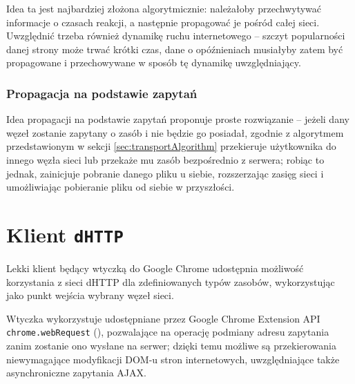 Idea ta jest najbardziej złożona algorytmicznie: należałoby przechwytywać informacje o czasach reakcji, a następnie propagować je pośród całej sieci. Uwzględnić trzeba również dynamikę ruchu internetowego -- szczyt popularności danej strony może trwać krótki czas, dane o opóźnieniach musiałyby zatem być propagowane i przechowywane w sposób tę dynamikę uwzględniający.

\subsubsection{Propagacja na podstawie zapytań}
Idea propagacji na podstawie zapytań proponuje proste rozwiązanie -- jeżeli dany węzeł zostanie zapytany o zasób i nie będzie go posiadał, zgodnie z algorytmem przedstawionym w sekcji \ref{sec:transportAlgorithm} przekieruje użytkownika do innego węzła sieci lub przekaże mu zasób bezpośrednio z serwera; robiąc to jednak, zainicjuje pobranie danego pliku u siebie, rozszerzając zasięg sieci i umożliwiając pobieranie pliku od siebie w przyszłości.

\section{Klient \texttt{dHTTP}}
Lekki klient będący wtyczką do Google Chrome udostępnia możliwość korzystania z sieci dHTTP dla zdefiniowanych typów zasobów, wykorzystując jako punkt wejścia wybrany węzeł sieci.

Wtyczka wykorzystuje udostępniane przez Google Chrome Extension API \texttt{chrome.webRequest} (\cite{webRequestAPI}), pozwalające na operację podmiany adresu zapytania zanim zostanie ono wysłane na serwer; dzięki temu możliwe są przekierowania  niewymagające modyfikacji DOM-u stron internetowych, uwzględniające także asynchroniczne zapytania AJAX.

